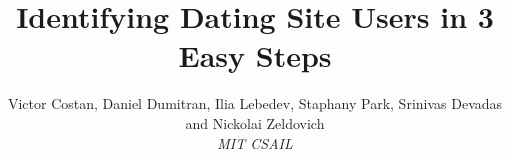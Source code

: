 \documentclass[10pt,twocolumn]{article}
\begin{document}
\title{Identifying Dating Site Users in 3 Easy Steps}
\author{
  Victor Costan, Daniel Dumitran, Ilia Lebedev, Staphany Park,
  Srinivas Devadas and Nickolai Zeldovich \\ \em MIT CSAIL}
\date{}

\maketitle









\setlength{\bibsep}{1pt}
\small


\end{document}
